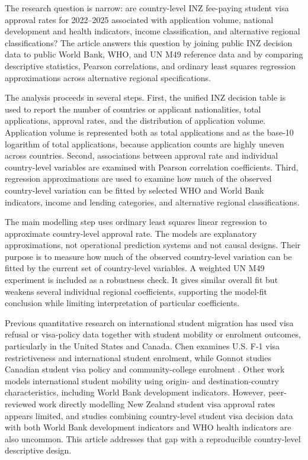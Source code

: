 \documentclass[runningheads]{llncs}
\begin{document}
The research question is narrow: are country-level INZ fee-paying student visa approval rates for 2022--2025 associated with application volume, national development and health indicators, income classification, and alternative regional classifications? The article answers this question by joining public INZ decision data to public World Bank, WHO, and UN M49 reference data and by comparing descriptive statistics, Pearson correlations, and ordinary least squares regression approximations across alternative regional specifications.

The analysis proceeds in several steps. First, the unified INZ decision table is used to report the number of countries or applicant nationalities, total applications, approval rates, and the distribution of application volume. Application volume is represented both as total applications and as the base-10 logarithm of total applications, because application counts are highly uneven across countries. Second, associations between approval rate and individual country-level variables are examined with Pearson correlation coefficients. Third, regression approximations are used to examine how much of the observed country-level variation can be fitted by selected WHO and World Bank indicators, income and lending categories, and alternative regional classifications.

The main modelling step uses ordinary least squares linear regression to approximate country-level approval rate. The models are explanatory approximations, not operational prediction systems and not causal designs. Their purpose is to measure how much of the observed country-level variation can be fitted by the current set of country-level variables. A weighted UN M49 experiment is included as a robustness check. It gives similar overall fit but weakens several individual regional coefficients, supporting the model-fit conclusion while limiting interpretation of particular coefficients.

Previous quantitative research on international student migration has used visa refusal or visa-policy data together with student mobility or enrolment outcomes, particularly in the United States and Canada. Chen examines U.S. F-1 visa restrictiveness and international student enrolment, while Gonnot studies Canadian student visa policy and community-college enrolment \cite{Chen2023,Gonnot2025}. Other work models international student mobility using origin- and destination-country characteristics, including World Bank development indicators. However, peer-reviewed work directly modelling New Zealand student visa approval rates appears limited, and studies combining country-level student visa decision data with both World Bank development indicators and WHO health indicators are also uncommon. This article addresses that gap with a reproducible country-level descriptive design.
\end{document}
